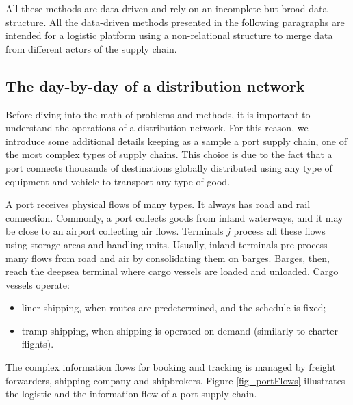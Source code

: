 All these methods are data-driven and rely on an incomplete but broad data structure. All the data-driven methods presented in the following paragraphs are intended for a logistic platform using a non-relational structure to merge data from different actors of the supply chain.

\subsection{The day-by-day of a distribution network}
Before diving into the math of problems and methods, it is important to understand the operations of a distribution network. For this reason, we introduce some additional details keeping as a sample a port supply chain, one of the most complex types of supply chains. This choice is due to the fact that a port connects thousands of destinations globally distributed using any type of equipment and vehicle to transport any type of good. \par

A port receives physical flows of many types. It always has road and rail connection. Commonly, a port collects goods from inland waterways, and it may be close to an airport collecting air flows. Terminals $j$ process all these flows using storage areas and handling units. Usually, inland terminals pre-process many flows from road and air by consolidating them on barges. Barges, then, reach the deepsea terminal where cargo vessels are loaded and unloaded. Cargo vessels operate:

\begin{itemize}
    \item liner shipping, when routes are predetermined, and the schedule is fixed;
    \item tramp shipping, when shipping is operated on-demand (similarly to charter flights).

\end{itemize}

The complex information flows for booking and tracking is managed by freight forwarders, shipping company and shipbrokers. Figure \ref{fig_portFlows} illustrates the logistic and the information flow of a port supply chain.



